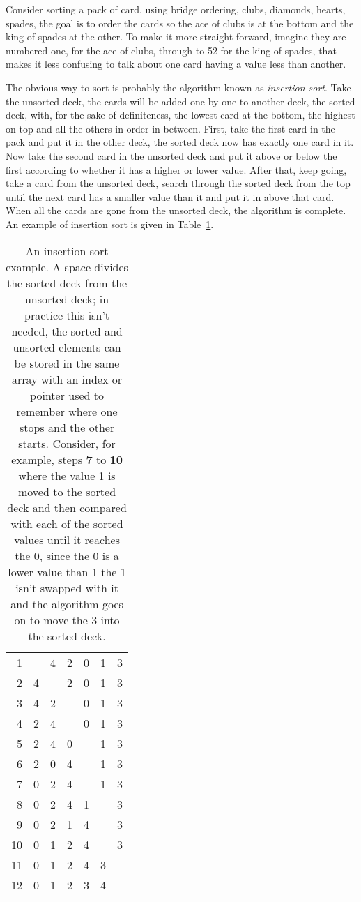 \documentclass[11pt,a4paper]{scrartcl}
\begin{document}
Consider sorting a pack of card, using bridge ordering, clubs,
diamonds, hearts, spades, the goal is to order the cards so the ace of
clubs is at the bottom and the king of spades at the other. To make it
more straight forward, imagine they are numbered one, for the ace of
clubs, through to 52 for the king of spades, that makes it less
confusing to talk about one card having a value less than another.

The obvious way to sort is probably the algorithm known as
\emph{insertion sort}.  Take the unsorted deck, the cards will be
added one by one to another deck, the sorted deck, with, for the sake
of definiteness, the lowest card at the bottom, the highest on top and
all the others in order in between. First, take the first card in the
pack and put it in the other deck, the sorted deck now has exactly one
card in it. Now take the second card in the unsorted deck and put it
above or below the first according to whether it has a higher or lower
value. After that, keep going, take a card from the unsorted deck,
search through the sorted deck from the top until the next card has a
smaller value than it and put it in above that card. When all the
cards are gone from the unsorted deck, the algorithm is complete. An
example of insertion sort is given in Table~\ref{tab_insertsort}.

\begin{table}
\begin{tabular}{r|cccccc}
1&&4&2&0&1&3\\
2&4&&2&0&1&3\\
3&4&2&&0&1&3\\
4&2&4&&0&1&3\\
5&2&4&0&&1&3\\
6&2&0&4&&1&3\\
7&0&2&4&&1&3\\
8&0&2&4&1&&3\\
9&0&2&1&4&&3\\
10&0&1&2&4&&3\\
11&0&1&2&4&3&\\
12&0&1&2&3&4&
\end{tabular}
\caption{An insertion sort example. A space divides the sorted deck
  from the unsorted deck; in practice this isn't needed, the sorted
  and unsorted elements can be stored in the same array with an index
  or pointer used to remember where one stops and the other
  starts. Consider, for example, steps {\bf 7} to {\bf 10} where the
  value 1 is moved to the sorted deck and then compared with each of
  the sorted values until it reaches the 0, since the 0 is a lower
  value than 1 the 1 isn't swapped with it and the algorithm goes on
  to move the 3 into the sorted deck.\label{tab_insertsort}}
\end{table}
\end{document}
